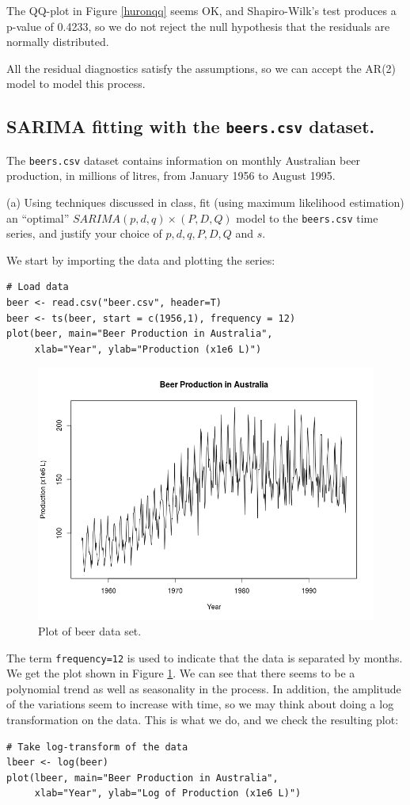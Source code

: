 \documentclass[]{article}
\begin{document}
The QQ-plot in Figure \ref{huronqq} seems OK, and Shapiro-Wilk's test produces a p-value of 0.4233, so we do not reject the null hypothesis that the residuals are normally distributed.

All the residual diagnostics satisfy the assumptions, so we can accept the AR(2) model to model this process.
\color{black}

\newpage
\subsection{SARIMA fitting with the \texttt{beers.csv} dataset.}
The \texttt{beers.csv} dataset contains information on monthly Australian beer production,
in millions of litres, from January 1956 to August 1995.

(a) Using techniques discussed in class, fit (using maximum likelihood estimation) an “optimal” $SARIMA(p,d,q) \times (P,D,Q)$ model to the \texttt{beers.csv} time series, and justify your choice of $p, d, q, P, D, Q$ and $s$.

\color{blue}
We start by importing the data and plotting the series:
\begin{Verbatim}[frame=single]
# Load data
beer <- read.csv("beer.csv", header=T)
beer <- ts(beer, start = c(1956,1), frequency = 12)
plot(beer, main="Beer Production in Australia",
     xlab="Year", ylab="Production (x1e6 L)")
\end{Verbatim}

\begin{figure}[!ht]
\centering
\includegraphics[width=.8\textwidth]{beer.png}
\caption{Plot of beer data set.}
\label{beer}
\end{figure}

The term \texttt{frequency=12} is used to indicate that the data is separated by months. We get the plot shown in Figure \ref{beer}. We can see that there seems to be a polynomial trend as well as seasonality in the process. In addition, the amplitude of the variations seem to increase with time, so we may think about doing a log transformation on the data. This is what we do, and we check the resulting plot:
\begin{Verbatim}[frame=single]
# Take log-transform of the data
lbeer <- log(beer)
plot(lbeer, main="Beer Production in Australia",
     xlab="Year", ylab="Log of Production (x1e6 L)")
\end{Verbatim}
\end{document}
